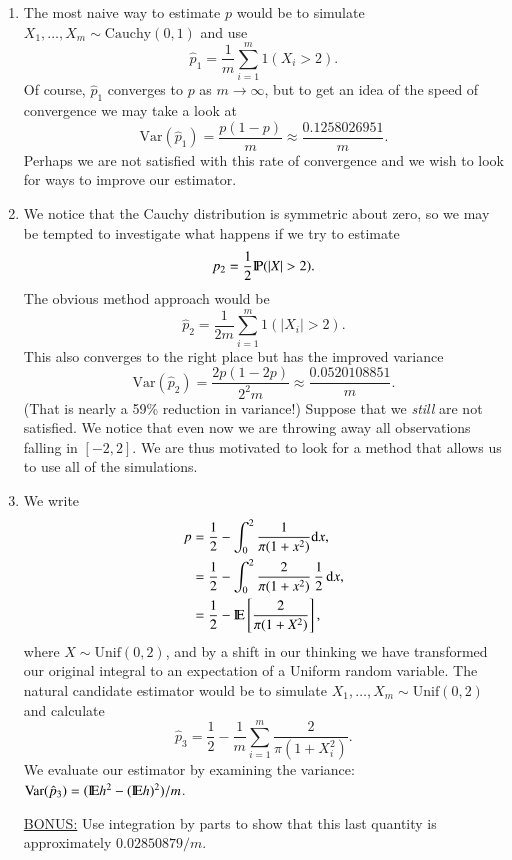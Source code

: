 \documentclass[captions=tableheading]{scrbook}
\begin{document}
\begin{enumerate}
\item The most naive way to estimate $p$ would be to simulate $X_{1},\ldots,X_{m} \sim \mathrm{Cauchy}(0,1)$ and use 
   \[
   \hat{p}_{1}=\frac{1}{m}\sum_{i=1}^{m}1(X_{i}>2).
   \]
   Of course, $\hat{p}_{1}$ converges to $p$ as $m\to\infty$, but to get an idea of the speed of convergence we may take a look at 
   \[
   \mbox{Var}(\hat{p}_{1})=\frac{p(1-p)}{m}\approx\frac{0.1258026951}{m}.
   \]
   Perhaps we are not satisfied with this rate of convergence and we wish to look for ways to improve our estimator.
\item We notice that the Cauchy distribution is symmetric about zero, so we may be tempted to investigate what happens if we try to estimate
   \[
   p_{2}=\frac{1}{2}\P(|X|>2).
   \]
   The obvious method approach would be 
   \[
   \hat{p}_{2}=\frac{1}{2m}\sum_{i=1}^{m}1(|X_{i}|>2).
   \]
   This also converges to the right place but has the improved variance
   \[
   \mbox{Var}(\hat{p}_{2})=\frac{2p(1-2p)}{2^{2}m}\approx\frac{0.0520108851}{m}.
   \]
   (That is nearly a 59\% reduction in variance!) Suppose that we \emph{still} are not satisfied. We notice that even now we are throwing away all observations falling in $[-2,2]$. We are thus motivated to look for a method that allows us to use all of the simulations.
\item We write 
   \begin{align*}
   p & =\frac{1}{2}-\int_{0}^{2}\frac{1}{\pi(1+x^{2})}\mathrm{d} x,\\
   & =\frac{1}{2}-\int_{0}^{2}\frac{2}{\pi(1+x^{2})}\,\frac{1}{2}\,\mathrm{d} x,\\
   & =\frac{1}{2}-\mathrm{I\hspace{-1.5pt}E}\left[\frac{2}{\pi(1+X^{2})}\right],
   \end{align*}
   where $X\sim\mathrm{Unif}(0,2)$, and by a shift in our thinking we have transformed our original integral to an expectation of a Uniform random variable. The natural candidate estimator would be to simulate $X_{1},\ldots,X_{m}\sim\mathrm{Unif}(0,2)$ and calculate
   \[
   \hat{p}_{3}=\frac{1}{2}-\frac{1}{m}\sum_{i=1}^{m}\frac{2}{\pi(1+X_{i}^{2})}.
   \]
   We evaluate our estimator by examining the variance: $\mbox{Var}(\hat{p}_{3})=(\mathrm{I\hspace{-1.5pt}E} h^{2}-(\mathrm{I\hspace{-1.5pt}E} h)^{2})/m$.

   \underline{BONUS:} Use integration by parts to show that this last quantity is approximately $0.02850879/m$.


\end{enumerate}
\end{document}
